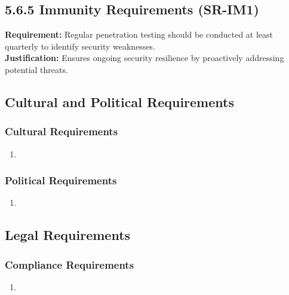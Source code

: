 \documentclass[]{article}
\begin{document}
\subsection*{5.6.5 Immunity Requirements (SR-IM1)}
\textbf{Requirement:} Regular penetration testing should be conducted at least quarterly to identify security weaknesses.\\
\textbf{Justification:} Ensures ongoing security resilience by proactively addressing potential threats.


\subsection{Cultural and Political Requirements}
\label{sub:cultural_and_political_requirements}

\subsubsection{Cultural Requirements}
\label{ssub:cultural_requirements}
\begin{enumerate}[{CP-C}1. ]
	\item 
\end{enumerate}

\subsubsection{Political Requirements}
\label{ssub:political_requirements}
\begin{enumerate}[{CP-P}1. ]
	\item 
\end{enumerate}


\subsection{Legal Requirements}
\label{sub:legal_requirements}

\subsubsection{Compliance Requirements}
\label{ssub:compliance_requirements}
\begin{enumerate}[{LR-COMP}1. ]
	\item 
\end{enumerate}
\end{document}
